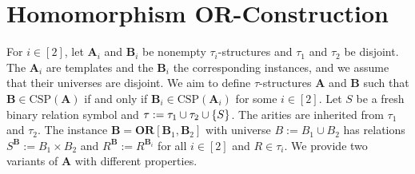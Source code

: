 \documentclass[a4paper,english, thm-restate]{lipics-v2021}
\DeclarePairedDelimiter\set{\lbrace}{\rbrace}
\newcommand{\sig}{\tau}
\newcommand{\StructA}{\mathbf{A}}
\newcommand{\StructB}{\mathbf{B}}
\newcommand{\CSP}[1]{\mathrm{CSP}(#1)}
\newcommand{\OR}[1]{\mathbf{OR}[#1]}
\begin{document}
	\section{Homomorphism OR-Construction}
	\label{sec:orConstruction}
	For $i \in [2]$, let $\StructA_i$ and $\StructB_i$ be nonempty $\sig_i$-structures and $\sig_1$ and $\sig_2$ be disjoint.
	The $\StructA_i$ are templates and the $\StructB_i$ the corresponding instances, and we assume that their universes are disjoint.
	We aim to define $\sig$-structures $\StructA$ and $\StructB$ such that $\StructB \in \CSP{\StructA}$ if and only if  $\StructB_i \in \CSP{\StructA_i}$ for some $i \in [2]$.
	Let $S$ be a fresh binary relation symbol and $\sig := \sig_1 \cup \sig_2 \cup \set{S}$.
	The arities are inherited from $\sig_1$ and $\sig_2$.
	The instance $\StructB = \OR{\StructB_1,\StructB_2}$
	with universe $B := B_1 \cup B_2$
	has relations $S^\StructB := B_1 \times B_2$ and $R^\StructB := R^{\StructB_i}$ for all  $i \in [2]$ and $R \in \sig_i$.
	We provide two variants of $\StructA$
	with  different properties.
	
\end{document}
